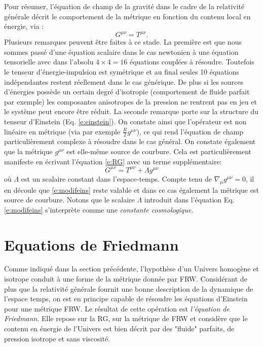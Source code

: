 Pour résumer, l'équation de champ de la gravité dans le cadre de la relativité générale décrit le comportement de la métrique en fonction du contenu local en énergie, via :
\begin{equation}
G^{\mu\nu}=T^{\mu\nu}.
\label{e:RG}
\end{equation}
Plusieurs remarques peuvent être faites à ce stade. La première est que nous sommes passé d'une équation scalaire dans le cas newtonien à une équation tensorielle avec dans l'absolu $ 4\times 4=16$ équations couplées à résoudre. Toutefois le tenseur d'énergie-impulsion est symétrique et au final seules 10 équations indépendantes restent réellement dans le cas générique. De plus si les sources d'énergies possède un certain degré d'isotropie (comportement de fluide parfait par exemple) les composantes anisotropes de la pression ne rentrent pas en jeu et le système peut encore être réduit. La seconde remarque porte sur la structure du tenseur d'Einstein (Eq. \ref{e:einstein}). On constate ainsi que l'opérateur est non linéaire  en métrique (via par exemple $\frac{R}{2}g^{\mu\nu}$), ce qui rend l'équation de champ particulièrement complexe à résoudre dans le cas général. On constate également que la métrique $g^{\mu\nu}$ est elle-même source de courbure. Cela est particulièrement manifeste en écrivant l'équation \ref{e:RG} avec un terme supplémentaire:
\begin{equation}
G^{\mu\nu}=T^{\mu\nu}+\Lambda g^{\mu\nu}
\label{e:modifeins}
\end{equation}
où $\Lambda$ est un scalaire constant dans l'espace-temps. Compte tenu de $\nabla_\mu g^{\mu \nu}=0$, il en découle que \ref{e:modifeins} reste valable et dans ce cas également la métrique est source de courbure. Notons que le scalaire $\Lambda$ introduit dans l'équation Eq. \ref{e:modifeins} s'interprète comme une \textit{constante cosmologique}.

\section{Equations de Friedmann}
Comme indiqué dans la section précédente, l'hypothèse d'un Univers homogène et isotrope conduit à une forme de la métrique donnée par FRW. Considérant de plus que la relativité générale fournit une bonne description de la dynamique de l'espace temps, on est en principe capable de résoudre les équations d'Einstein pour une métrique FRW. Le résultat de cette opération est \textit{l'équation de Friedmann}. Elle repose sur la RG, sur la métrique de FRW et considère que le contenu en énergie de l'Univers est bien décrit par des "fluide" parfaits, de pression isotrope et sans viscosité.

